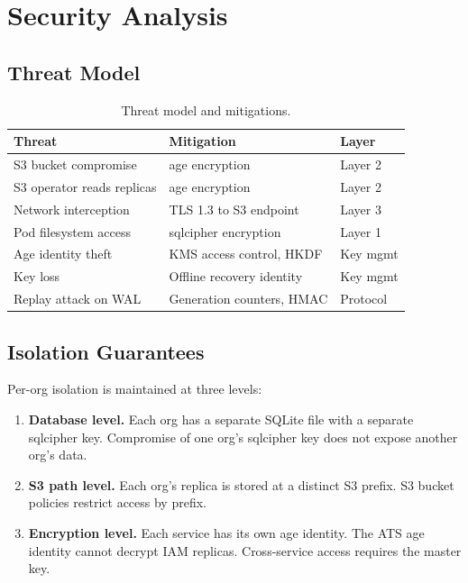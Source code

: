 \section{Security Analysis}


\subsection{Threat Model}

\begin{table}[H]
\centering
\begin{tabular}{@{}lll@{}}
\toprule
\textbf{Threat} & \textbf{Mitigation} & \textbf{Layer} \\
\midrule
S3 bucket compromise         & age encryption             & Layer 2 \\
S3 operator reads replicas   & age encryption             & Layer 2 \\
Network interception          & TLS 1.3 to S3 endpoint    & Layer 3 \\
Pod filesystem access         & sqlcipher encryption       & Layer 1 \\
Age identity theft            & KMS access control, HKDF  & Key mgmt \\
Key loss                      & Offline recovery identity  & Key mgmt \\
Replay attack on WAL          & Generation counters, HMAC  & Protocol \\
\bottomrule
\end{tabular}
\caption{Threat model and mitigations.}
\label{tab:threats}
\end{table}

\subsection{Isolation Guarantees}

Per-org isolation is maintained at three levels:

\begin{enumerate}[nosep]
    \item \textbf{Database level.} Each org has a separate SQLite file with a
    separate sqlcipher key. Compromise of one org's sqlcipher key does not
    expose another org's data.

    \item \textbf{S3 path level.} Each org's replica is stored at a distinct
    S3 prefix. S3 bucket policies restrict access by prefix.

    \item \textbf{Encryption level.} Each service has its own age identity.
    The ATS age identity cannot decrypt IAM replicas. Cross-service access
    requires the master key.
\end{enumerate}

